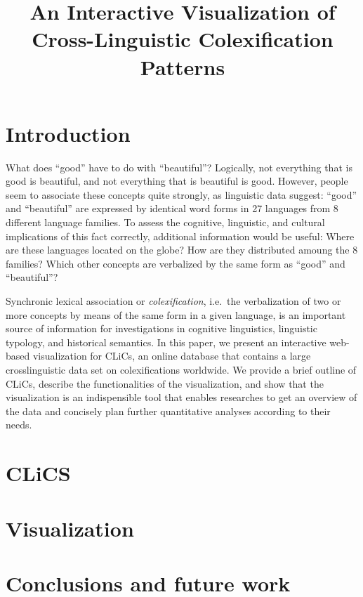 \documentclass[10pt, a4paper]{article}
\title{An Interactive Visualization of Cross-Linguistic Colexification Patterns}
\begin{document}
\maketitleabstract

\section{Introduction}

What does ``good'' have to do with ``beautiful''? Logically, not everything that is good is beautiful, and not everything that is beautiful is good. However, people seem to associate these concepts quite strongly, as linguistic data suggest: ``good'' and ``beautiful'' are expressed by identical word forms in 27 languages from 8 different language families. To assess the cognitive, linguistic, and cultural implications of this fact correctly, additional information would be useful: Where are these languages located on the globe? How are they distributed amoung the 8 families? Which other concepts are verbalized by the same form as ``good'' and ``beautiful''?

Synchronic lexical association or \textsl{colexification}, i.e.~the verbalization of two or more concepts by means of the same form in a given language, is an important source of information for investigations in cognitive linguistics, linguistic typology, and historical semantics. In this paper, we present an interactive web-based visualization for CLiCs, an online database that contains a large crosslinguistic data set on colexifications worldwide. We provide a brief outline of CLiCs, describe the functionalities of the visualization, and show that the visualization is an indispensible tool that enables researches to get an overview of the data and concisely plan further quantitative analyses according to their needs.

\section{CLiCS}



\section{Visualization}



\section{Conclusions and future work}
\end{document}
